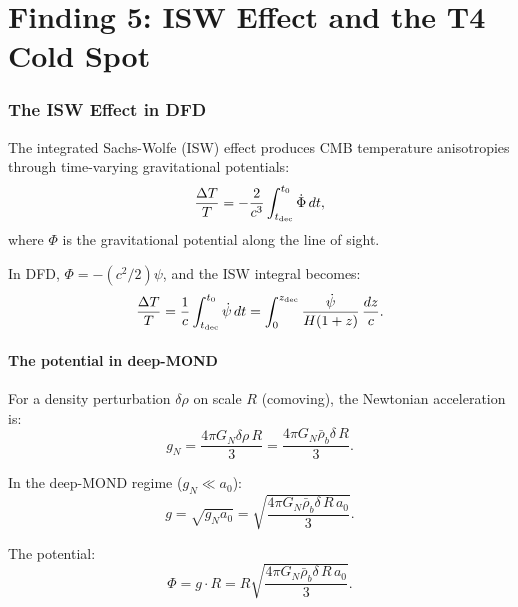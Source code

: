 \documentclass[11pt]{article}
\newcommand{\aM}{a_0}
\newcommand{\rhob}{\bar{\rho}_b}
\begin{document}
\part{Finding 5: ISW Effect and the T4 Cold Spot}
\label{part:ISW}

\section{The ISW Effect in DFD}

The integrated Sachs-Wolfe (ISW) effect produces CMB temperature
anisotropies through time-varying gravitational potentials:
\begin{equation}
\frac{\Delta T}{T} = -\frac{2}{c^3}\int_{t_{\rm dec}}^{t_0}
\dot\Phi\,dt,
\label{eq:ISW}
\end{equation}
where $\Phi$ is the gravitational potential along the line of sight.

In DFD, $\Phi = -(c^2/2)\psi$, and the ISW integral becomes:
\begin{equation}
\frac{\Delta T}{T} = \frac{1}{c}\int_{t_{\rm dec}}^{t_0}\dot\psi\,dt
= \int_0^{z_{\rm dec}}\frac{\dot\psi}{H(1+z)}\,\frac{dz}{c}.
\end{equation}

\subsection{The potential in deep-MOND}

For a density perturbation $\delta\rho$ on scale $R$ (comoving),
the Newtonian acceleration is:
\begin{equation}
g_N = \frac{4\pi G_N\delta\rho\,R}{3} = \frac{4\pi G_N\rhob\delta\,R}{3}.
\end{equation}

In the deep-MOND regime ($g_N \ll \aM$):
\begin{equation}
g = \sqrt{g_N\aM} = \sqrt{\frac{4\pi G_N\rhob\delta\,R\,\aM}{3}}.
\end{equation}

The potential:
\begin{equation}
\Phi = g\cdot R = R\sqrt{\frac{4\pi G_N\rhob\delta\,R\,\aM}{3}}.
\end{equation}
\end{document}
